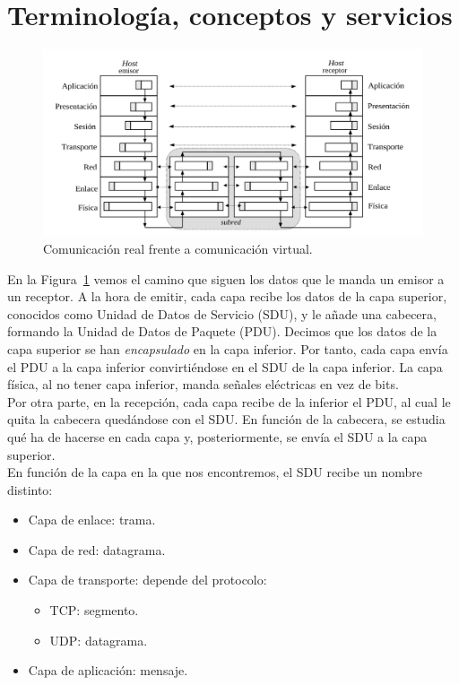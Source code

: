 \section{Terminología, conceptos y servicios} \label{sec:terminologia}

\begin{figure}
    \centering
    \includegraphics[width=0.8\linewidth]{./images/comunicacionHosts.png}
    \caption{Comunicación real frente a comunicación virtual.}
    \label{fig:comHosts}
\end{figure}

En la Figura~\ref{fig:comHosts} vemos el camino que siguen los datos que le manda un emisor a un receptor. A la hora de emitir, cada capa recibe los datos de la capa superior, conocidos como Unidad de Datos de Servicio (\acrfull{SDU}), y le añade una cabecera, formando la Unidad de Datos de Paquete (\acrfull{PDU}). Decimos que los datos de la capa superior se han \emph{encapsulado} en la capa inferior. Por tanto, cada capa envía el \acrshort{PDU} a la capa inferior convirtiéndose en el \acrshort{SDU} de la capa inferior. La capa física, al no tener capa inferior, manda señales eléctricas en vez de bits. \\

Por otra parte, en la recepción, cada capa recibe de la inferior el \acrshort{PDU}, al cual le quita la cabecera quedándose con el \acrshort{SDU}. En función de la cabecera, se estudia qué ha de hacerse en cada capa y, posteriormente, se envía el \acrshort{SDU} a la capa superior.\\

En función de la capa en la que nos encontremos, el \acrshort{SDU} recibe un nombre distinto:
\begin{itemize}
    \item Capa de enlace: trama.
    \item Capa de red: datagrama.
    \item Capa de transporte: depende del protocolo:
        \begin{itemize}
            \item \acrshort{TCP}: segmento.
            \item \acrshort{UDP}: datagrama.
        \end{itemize}
    \item Capa de aplicación: mensaje.
\end{itemize}

